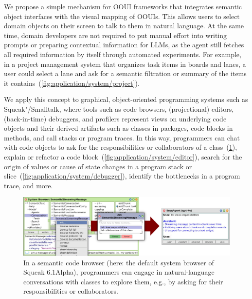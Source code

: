 We propose a simple mechanism for OOUI frameworks that integrates semantic object interfaces with the visual mapping of OOUIs.
This allows users to select domain objects on their screen to talk to them in natural language.
At the same time, domain developers are not required to put manual effort into writing prompts or preparing contextual information for LLMs, as the agent still fetches all required information by itself through automated experiments.
For example, in a project management system that organizes task items in boards and lanes, a user could select a lane and ask for a semantic filtration or summary of the items it contains~(\cref{fig:application/system/project}).

We apply this concept to graphical, object-oriented programming systems such as Squeak"/Smalltalk, where tools such as code browsers, (projectional) editors, (back-in-time) debuggers, and profilers represent views on underlying code objects and their derived artifacts such as classes in packages, code blocks in methods, and call stacks or program traces.
In this way, programmers can chat with code objects to ask for the responsibilities or collaborators of a class~(\cref{fig:application/system/browser}), explain or refactor a code block~(\cref{fig:application/system/editor}), search for the origin of values or cause of state changes in a program stack or slice~(\cref{fig:application/system/debugger}), identify the bottlenecks in a program trace, and more.

\FloatBarrier

\begin{figure}[Z]
	\centering
	\includegraphics[width=\linewidth]{chapters/08_application/03_system/browser.png}
	\caption[In a semantic code browser, programmers can engage in natural-language conversations with classes to explore them, e.g., by asking for their responsibilities or collaborators.]{
		In a semantic code browser (here: the default system browser of Squeak 6.1Alpha), programmers can engage in natural-language conversations with classes to explore them, e.g., by asking for their responsibilities or collaborators.
	}
	\label{fig:application/system/browser}
\end{figure}

